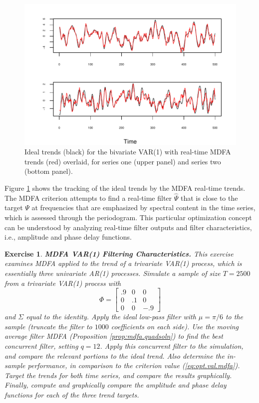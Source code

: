 \documentclass[a4paper]{book}
\newtheorem{Exercise}{Exercise}
\begin{document}
\begin{figure}[htb!]
\begin{center}
\includegraphics[]{"mdfa_var1_filtering.pdf"}
\caption{Ideal trends (black) for the bivariate VAR(1)
	with real-time MDFA trends (red) overlaid, for series one (upper panel)
	and series two (bottom panel). }
\label{fig:var1.trends}
\end{center}
\end{figure}

 Figure \ref{fig:var1.trends} shows the tracking of the ideal trends
 by the MDFA real-time trends.
The MDFA criterion  attempts to find a real-time filter $\widehat{\Psi}$
 that is close to the target $\Psi$ at frequencies that are emphasized
 by spectral content in the time series, which is assessed
 through the periodogram.   This particular 
optimization concept can be understood 
  by analyzing real-time filter outputs and filter 
  characteristics, i.e., amplitude and phase delay functions.


\begin{Exercise} {\bf MDFA VAR(1) Filtering Characteristics.} \rm
\label{exer:var1mdfa2.filter}
 This exercise examines MDFA applied to the trend of a trivariate VAR(1) process,
 which is essentially three univariate AR(1) processes.
Simulate a sample of size $T=2500$ from a
 trivariate VAR(1) process with 
\[
  \Phi = \left[ \begin{array}{lll} .9 & 0 & 0 \\  0 & .1 & 0  \\ 0 & 0 & -.9
   \end{array} \right]
\]
 and $\Sigma$ equal to the identity.   
  Apply the   ideal low-pass filter  with 
  $\mu = \pi/6$ to the sample (truncate the filter to $1000$ coefficients on each side).  
 Use the moving average filter
 MDFA  (Proposition \ref{prop:mdfa.quadsoln}) to find the best
 concurrent filter, setting $q= 12$.  Apply this concurrent filter 
 to the simulation, and compare the relevant portions to the ideal trend.
Also determine the in-sample performance, in comparison to the criterion value
 (\ref{eq:opt.val.mdfa}).
  Target the trends for both time series, and compare the results graphically.
 Finally, compute and graphically compare  the amplitude and phase delay
   functions for each of the three trend targets.
\end{Exercise}
\end{document}
